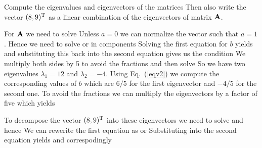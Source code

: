

\label{exBeeEV}%
Compute the eigenvalues and eigenvectors of the matrices  
Then also write the vector $(8,9)^{\rm T}$ as a linear combination of the eigenvectors of matrix $\bf A$. 

\solution 
For ${\bf A}$ we need to solve 
Unless $a=0$ we can normalize the vector such that $a=1$. Hence we need to solve 
or in components
Solving the first equation for $b$ yields 
and substituting this back into the second equation gives us the condition 
We multiply both sides by 5 to avoid the fractions and then solve
So we have two eigenvalues $\lambda_1 = 12$ and $\lambda_2=-4$. Using Eq.~(\ref{eqv2}) we compute the corresponding values of $b$ which are 
$6/5$ for the first eigenvector and $-4/5$ for the second one. To avoid the fractions we can multiply the eigenvectors by a factor of five which yields 

To decompose the vector $(8,9)^{\rm T}$ into these eigenvectors we need to solve 
and hence 
We can rewerite the first equation as 
or 
Substituting into the second equation yields
and correspodingly 

